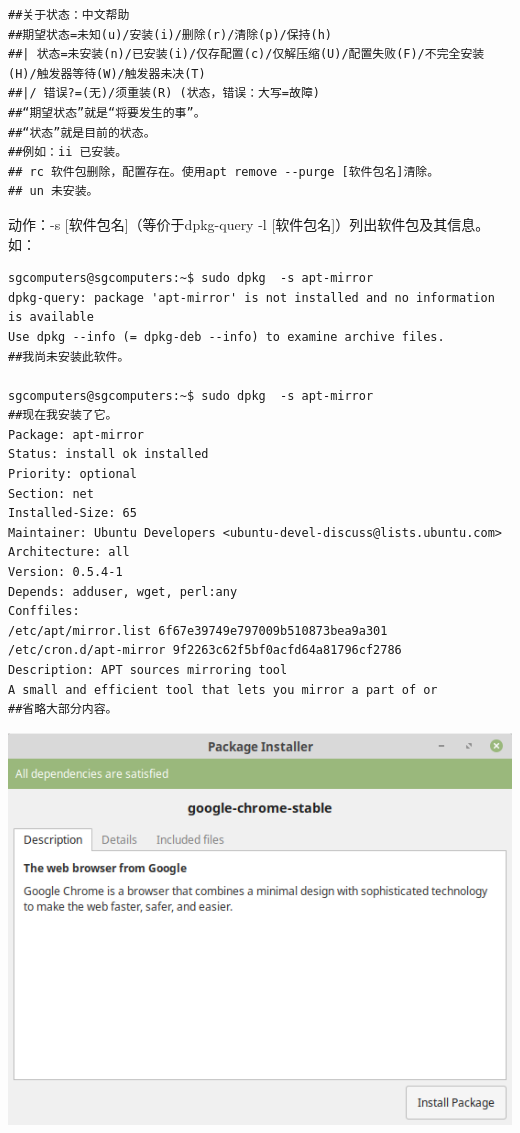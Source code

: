 \documentclass{book}
\begin{document}
\begin{verbatim}
##关于状态：中文帮助
##期望状态=未知(u)/安装(i)/删除(r)/清除(p)/保持(h)
##| 状态=未安装(n)/已安装(i)/仅存配置(c)/仅解压缩(U)/配置失败(F)/不完全安装(H)/触发器等待(W)/触发器未决(T)
##|/ 错误?=(无)/须重装(R) (状态，错误：大写=故障)
##“期望状态”就是“将要发生的事”。
##“状态”就是目前的状态。
##例如：ii 已安装。
## rc 软件包删除，配置存在。使用apt remove --purge [软件包名]清除。
## un 未安装。
\end{verbatim}

动作：-s [软件包名]（等价于dpkg-query -l [软件包名]）列出软件包及其信息。如：
\begin{verbatim}
sgcomputers@sgcomputers:~$ sudo dpkg  -s apt-mirror
dpkg-query: package 'apt-mirror' is not installed and no information is available
Use dpkg --info (= dpkg-deb --info) to examine archive files.
##我尚未安装此软件。

sgcomputers@sgcomputers:~$ sudo dpkg  -s apt-mirror
##现在我安装了它。
Package: apt-mirror
Status: install ok installed
Priority: optional
Section: net
Installed-Size: 65
Maintainer: Ubuntu Developers <ubuntu-devel-discuss@lists.ubuntu.com>
Architecture: all
Version: 0.5.4-1
Depends: adduser, wget, perl:any
Conffiles:
/etc/apt/mirror.list 6f67e39749e797009b510873bea9a301
/etc/cron.d/apt-mirror 9f2263c62f5bf0acfd64a81796cf2786
Description: APT sources mirroring tool
A small and efficient tool that lets you mirror a part of or
##省略大部分内容。
\end{verbatim}
\begin{center}
	\includegraphics[scale=0.4]{pic/gdebi.png}
\end{center}
\end{document}
